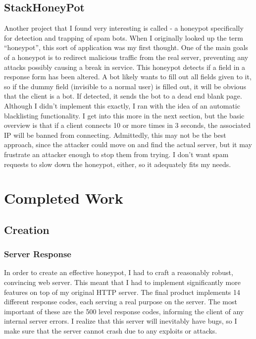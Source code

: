 \documentclass[12pt]{article}
\begin{document}
\subsection{StackHoneyPot}
Another project that I found very interesting is called  - a honeypot specifically for detection and trapping of spam bots.
When I originally looked up the term ``honeypot'', this sort of application was my first thought.
One of the main goals of a honeypot is to redirect malicious traffic from the real server, preventing any attacks possibly causing a break in service.
This honeypot detects if a field in a response form has been altered.
A bot likely wants to fill out all fields given to it, so if the dummy field (invisible to a normal user) is filled out, it will be obvious that the client is a bot.
If detected, it sends the bot to a dead end blank page.
Although I didn't implement this exactly, I ran with the idea of an automatic blacklisting functionality.
I get into this more in the next section, but the basic overview is that if a client connects 10 or more times in 3 seconds, the associated IP will be banned from connecting.
Admittedly, this may not be the best approach, since the attacker could move on and find the actual server, but it may frustrate an attacker enough to stop them from trying.
I don't want spam requests to slow down the honeypot, either, so it adequately fits my needs.

\section{Completed Work}

\subsection{Creation}

\subsubsection{Server Response}
In order to create an effective honeypot, I had to craft a reasonably robust, convincing web server.
This meant that I had to implement significantly more features on top of my original HTTP server.
The final product implements 14 different response codes, each serving a real purpose on the server.
The most important of these are the 500 level response codes, informing the client of any internal server errors.
I realize that this server will inevitably have bugs, so I make sure that the server cannot crash due to any exploits or attacks.
\end{document}
